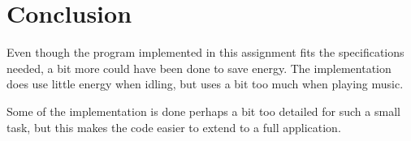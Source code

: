 \section{Conclusion}
Even though the program implemented in this assignment fits the specifications needed, a bit more could have been done to save energy.
The implementation does use little energy when idling, but uses a bit too much when playing music.

Some of the implementation is done perhaps a bit too detailed for such a small task, but this makes the code easier to extend to a full application.
